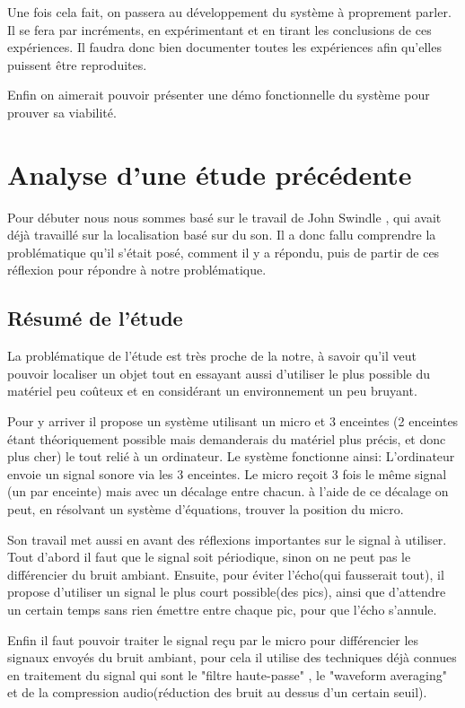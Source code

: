 \documentclass[12pt,a4paper]{report}
\begin{document}
Une fois cela fait, on passera au développement du système à proprement parler. Il se fera par incréments, en expérimentant et en tirant les conclusions de ces expériences. Il faudra donc bien documenter toutes les expériences afin qu'elles puissent être reproduites.

Enfin on aimerait pouvoir présenter une démo fonctionnelle du système pour prouver sa viabilité.

\chapter{Analyse d'une étude précédente}

Pour débuter nous nous sommes basé sur le travail de John Swindle \cite{john_swindle2010}, qui avait déjà travaillé sur la localisation basé sur du son. Il a donc fallu comprendre la problématique qu'il s'était posé, comment il y a répondu, puis de partir de ces réflexion pour répondre à notre problématique.

\section{Résumé de l'étude}
La problématique de l'étude est très proche de la notre, à savoir qu'il veut pouvoir localiser un objet tout en essayant aussi d'utiliser le plus possible du matériel peu coûteux et en considérant un environnement un peu bruyant.

Pour y arriver il propose un système utilisant un micro et 3 enceintes (2 enceintes étant théoriquement possible mais demanderais du matériel plus précis, et donc plus cher) le tout relié à un ordinateur.
Le système fonctionne ainsi: L'ordinateur envoie un signal sonore via les 3 enceintes. Le micro reçoit 3 fois le même signal (un par enceinte) mais avec un décalage entre chacun. à l'aide de ce décalage on peut, en résolvant un système d'équations, trouver la position du micro.

Son travail met aussi en avant des réflexions importantes sur le signal à utiliser. Tout d'abord il faut que le signal soit périodique, sinon on ne peut pas le différencier du bruit ambiant. Ensuite, pour éviter l'écho(qui fausserait tout), il propose d'utiliser un signal le plus court possible(des pics), ainsi que d'attendre un certain temps sans rien émettre entre chaque pic, pour que l'écho s'annule.

Enfin il faut pouvoir traiter le signal reçu par le micro pour différencier les signaux envoyés du bruit ambiant, pour cela il utilise des techniques déjà connues en traitement du signal qui sont le "filtre haute-passe" , le "waveform averaging" et de la compression audio(réduction des bruit au dessus d'un certain seuil).
\end{document}
